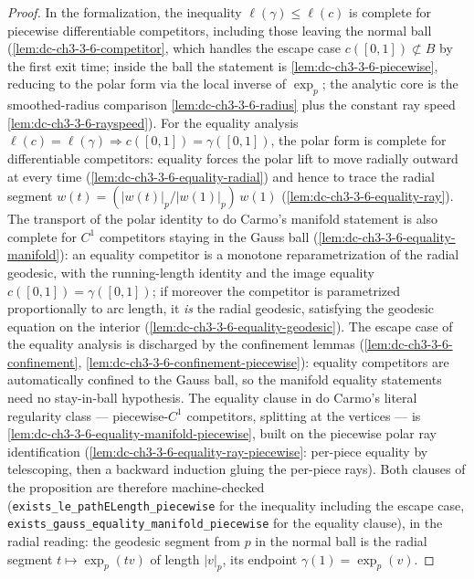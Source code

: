 \begin{proof}
  In the formalization, the inequality $\ell(\gamma)\le\ell(c)$ is complete
  for piecewise differentiable competitors, including those leaving the
  normal ball (\cref{lem:dc-ch3-3-6-competitor}, which handles the escape
  case $c([0,1])\not\subset B$ by the first exit time; inside the ball the
  statement is \cref{lem:dc-ch3-3-6-piecewise}, reducing to the polar form
  via the local inverse of $\exp_p$; the analytic core is the smoothed-radius
  comparison \cref{lem:dc-ch3-3-6-radius} plus the constant ray speed
  \cref{lem:dc-ch3-3-6-rayspeed}). For the equality analysis
  $\ell(c)=\ell(\gamma)\Rightarrow c([0,1])=\gamma([0,1])$, the polar form
  is complete for differentiable competitors: equality forces the polar
  lift to move radially outward at every time
  (\cref{lem:dc-ch3-3-6-equality-radial}) and hence to trace the radial
  segment $w(t)=(|w(t)|_p/|w(1)|_p)\,w(1)$
  (\cref{lem:dc-ch3-3-6-equality-ray}). The transport of the polar
  identity to do Carmo's manifold statement is also complete for $C^1$
  competitors staying in the Gauss ball
  (\cref{lem:dc-ch3-3-6-equality-manifold}): an equality competitor is a
  monotone reparametrization of the radial geodesic, with the running-length
  identity and the image equality $c([0,1])=\gamma([0,1])$; if moreover the
  competitor is parametrized proportionally to arc length, it \emph{is} the
  radial geodesic, satisfying the geodesic equation on the interior
  (\cref{lem:dc-ch3-3-6-equality-geodesic}). The escape case of the
  equality analysis is discharged by the confinement lemmas
  (\cref{lem:dc-ch3-3-6-confinement},
  \cref{lem:dc-ch3-3-6-confinement-piecewise}): equality competitors are
  automatically confined to the Gauss ball, so the manifold equality
  statements need no stay-in-ball hypothesis. The equality clause in do
  Carmo's literal regularity class — piecewise-$C^1$ competitors, splitting
  at the vertices — is \cref{lem:dc-ch3-3-6-equality-manifold-piecewise},
  built on the piecewise polar ray identification
  (\cref{lem:dc-ch3-3-6-equality-ray-piecewise}: per-piece equality by
  telescoping, then a backward induction gluing the per-piece rays). Both
  clauses of the proposition are therefore machine-checked
  (\texttt{exists\_le\_pathELength\_piecewise} for the inequality including
  the escape case, \texttt{exists\_gauss\_equality\_manifold\_piecewise}
  for the equality clause), in the radial reading: the geodesic segment
  from $p$ in the normal ball is the radial segment $t\mapsto\exp_p(tv)$ of
  length $|v|_p$, its endpoint $\gamma(1)=\exp_p(v)$.
\end{proof}

